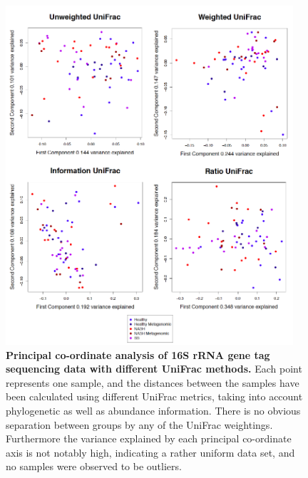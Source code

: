 \begin{figure}[h]
\begin{center}
\includegraphics[width=0.95\textwidth]{nafld_16s_pcoa.png}
\caption[Principal co-ordinate analysis of 16S rRNA gene tag sequencing data with different UniFrac weightings.]{\textbf{Principal co-ordinate analysis of 16S rRNA gene tag sequencing data with different UniFrac methods.} Each point represents one sample, and the distances between the samples have been calculated using different UniFrac metrics, taking into account phylogenetic as well as abundance information. There is no obvious separation between groups by any of the UniFrac weightings. Furthermore the variance explained by each principal co-ordinate axis is not notably high, indicating a rather uniform data set, and no samples were observed to be outliers.}
\label{nafld_pcoa}
\end{center}
\end{figure}

